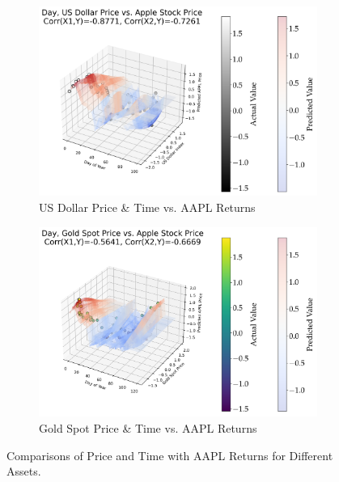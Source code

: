 \begin{figure}[htbp]
    \centering
    \begin{subfigure}[b]{0.45\textwidth}
        \centering
        \includegraphics[width=\textwidth]{figures/2d_AAPL.png}
        \caption{US Dollar Price \& Time vs. AAPL Returns}
        \label{fig:2d_aapl}
    \end{subfigure}
    \hfill
    \begin{subfigure}[b]{0.45\textwidth}
        \centering
        \includegraphics[width=\textwidth]{figures/2d_gold.png}
        \caption{Gold Spot Price \& Time vs. AAPL Returns}
        \label{fig:2d_gold}
    \end{subfigure}
    \caption{Comparisons of Price and Time with AAPL Returns for Different Assets.}
    \label{fig:2d_comparison}
\end{figure}


